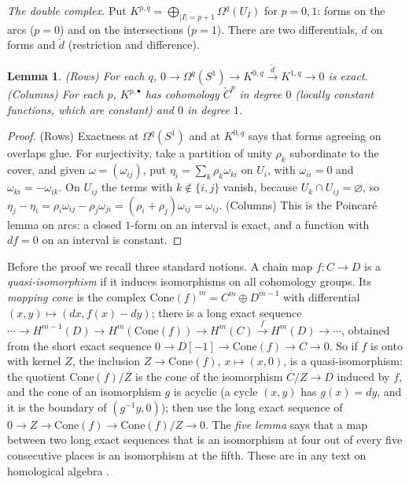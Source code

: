 \documentclass[11pt,oneside,reqno]{article}
\newcommand{\Om}{\Omega}
\theoremstyle{plain}
\newtheorem{lemma}[theorem]{Lemma}
\theoremstyle{definition}
\theoremstyle{remark}
\begin{document}
\emph{The double complex.} Put \(K^{p,q}=\bigoplus_{|I|=p+1}\Om^q(U_I)\) for \(p=0,1\): forms on the arcs
(\(p=0\)) and on the intersections (\(p=1\)). There are two differentials, \(d\) on forms and
\(\check d\) (restriction and difference).

\begin{lemma}\label{lem:weilrows}
\textup{(Rows)} For each \(q\), \(0\to\Om^q(S^1)\to K^{0,q}\xrightarrow{\check d}K^{1,q}\to0\) is exact.
\textup{(Columns)} For each \(p\), \(K^{p,\bullet}\) has cohomology \(\check C^p\) in degree \(0\) (locally
constant functions, which are constant) and \(0\) in degree \(1\).
\end{lemma}

\begin{proof}
(Rows) Exactness at \(\Om^q(S^1)\) and at \(K^{0,q}\) says that forms agreeing on overlaps glue.
For surjectivity, take a partition of unity \(\rho_k\) subordinate to the cover, and given
\(\omega=(\omega_{ij})\), put \(\eta_i=\sum_k\rho_k\omega_{ki}\) on \(U_i\), with \(\omega_{ii}=0\) and \(\omega_{ki}=-\omega_{ik}\). On
\(U_{ij}\) the terms with \(k\notin\{i,j\}\) vanish, because \(U_k\cap U_{ij}=\varnothing\), so
\(\eta_j-\eta_i=\rho_i\omega_{ij}-\rho_j\omega_{ji}=(\rho_i+\rho_j)\omega_{ij}=\omega_{ij}\). (Columns) This is the
Poincaré lemma on arcs: a closed \(1\)-form on an interval is exact, and a function with
\(df=0\) on an interval is constant.
\end{proof}

Before the proof we recall three standard notions. A chain map \(f:C\to D\) is a
\emph{quasi-isomorphism} if it induces isomorphisms on all cohomology groups. Its
\emph{mapping cone} is the complex \(\mathrm{Cone}(f)^m=C^m\oplus D^{m-1}\) with differential
\((x,y)\mapsto(dx,f(x)-dy)\); there is a long exact sequence
\(\cdots\to H^{m-1}(D)\to H^m(\mathrm{Cone}(f))\to H^m(C)\xrightarrow{f}H^m(D)\to\cdots\), obtained from the
short exact sequence \(0\to D[-1]\to\mathrm{Cone}(f)\to C\to0\). So if \(f\) is onto with kernel
\(Z\), the inclusion \(Z\to\mathrm{Cone}(f)\), \(x\mapsto(x,0)\), is a quasi-isomorphism: the quotient
\(\mathrm{Cone}(f)/Z\) is the cone of the isomorphism \(C/Z\to D\) induced by \(f\), and the cone of
an isomorphism \(g\) is acyclic (a cycle \((x,y)\) has \(g(x)=dy\), and it is the boundary of
\((g^{-1}y,0)\)); then use the long exact sequence of \(0\to Z\to\mathrm{Cone}(f)\to\mathrm{Cone}(f)/Z\to0\). The \emph{five lemma} says that a map between two long exact
sequences that is an isomorphism at four out of every five consecutive places is an
isomorphism at the fifth. These are in any text on homological algebra
\cite[Ch.~1]{Weibel}.
\end{document}
